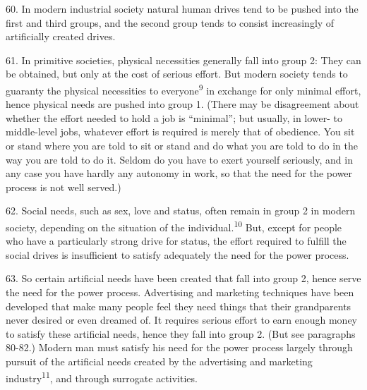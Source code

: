 \documentclass{article}
\begin{document}
60.  In modern industrial society natural human drives tend to be pushed into the first and third 
groups, and the second group tends to consist increasingly of artificially created drives. \vspace{\baselineskip}

61.  In primitive societies, physical necessities generally fall into group 2: They can be obtained, 
but only at the cost of serious effort.  But modern society tends to guaranty the physical necessities 
to everyone\textsuperscript{9} in exchange for only minimal effort, hence physical needs are pushed into group 1. 
(There  may  be  disagreement  about  whether  the  effort  needed  to  hold  a  job  is  “minimal”;  but  
usually, in lower- to middle-level jobs, whatever effort is required is merely that of 
obedience.  You sit or stand where you are told to sit or stand and do what you are told to do in the 
way  you are told to do it.  Seldom do  you have to exert  yourself seriously, and in any case  you  
have hardly any autonomy in work, so that the need for the power process is not well served.) \vspace{\baselineskip}

62.  Social  needs,  such  as  sex,  love  and  status,  often  remain  in  group  2  in  modern  society,  
depending  on  the  situation  of  the  individual.\textsuperscript{10}  But,  except  for  people  who  have  a  particularly  
strong  drive  for  status,  the  effort  required  to  fulfill  the  social  drives  is  insufficient  to  satisfy  
adequately the need for the power process. \vspace{\baselineskip}

63.  So certain artificial needs have been created that fall into group 2, hence serve the need for the 
power  process.   Advertising  and  marketing  techniques  have  been  developed  that  make  many  
people feel they need things that their grandparents never desired or even dreamed of.  It requires 
serious effort to earn enough money to satisfy these artificial needs, hence they fall into group 2. 
(But  see  paragraphs  80-82.)  Modern  man  must  satisfy  his  need  for  the  power  process  largely  
through  pursuit  of  the  artificial  needs  created  by  the  advertising  and  marketing  industry\textsuperscript{11},  and 
through surrogate activities. \vspace{\baselineskip}
\end{document}
